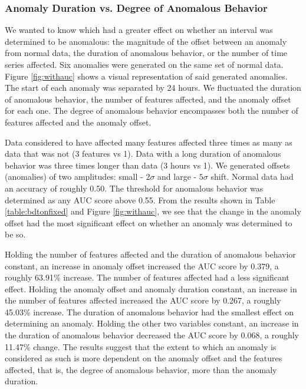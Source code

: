 \documentclass[5p]{elsarticle}
\begin{document}
\subsubsection{Anomaly Duration vs. Degree of Anomalous Behavior}

We wanted to know which had a greater effect on whether an interval was determined to be anomalous: the magnitude of the offset between an anomaly from normal data, the duration of anomalous behavior, or the number of time series affected. Six anomalies were generated on the same set of normal data. Figure \ref{fig:withauc} shows a visual representation of said generated anomalies. The start of each anomaly was separated by 24 hours. We fluctuated the duration of anomalous behavior, the number of features affected, and the anomaly offset for each one. The degree of anomalous behavior encompasses both the number of features affected and the anomaly offset.

Data considered to have affected many features affected three times as many as data that was not (3 features vs 1). Data with a long duration of anomalous behavior was three times longer than data (3 hours vs 1). We generated offsets (anomalies) of two amplitudes: small - $2\sigma$ and large - $5\sigma$ shift. Normal data had an accuracy of roughly 0.50. The threshold for anomalous behavior was determined as any AUC score above 0.55. From the results shown in Table \ref{table:bdtonfixed} and Figure \ref{fig:withauc}, we see that the change in the anomaly offset had the most significant effect on whether an anomaly was determined to be so.

Holding the number of features affected and the duration of anomalous behavior constant, an increase in anomaly offset increased the AUC score by 0.379, a roughly 63.91\% increase. The number of features affected had a less significant effect. Holding the anomaly offset and anomaly duration constant, an increase in the number of features affected increased the AUC score by 0.267, a roughly 45.03\% increase. The duration of anomalous behavior had the smallest effect on determining an anomaly. Holding the other two variables constant, an increase in the duration of anomalous behavior decreased the AUC score by 0.068, a roughly 11.47\% change. The results suggest that the extent to which an anomaly is considered as such is more dependent on the anomaly offset and the features affected, that is, the degree of anomalous behavior, more than the anomaly duration.
\end{document}
